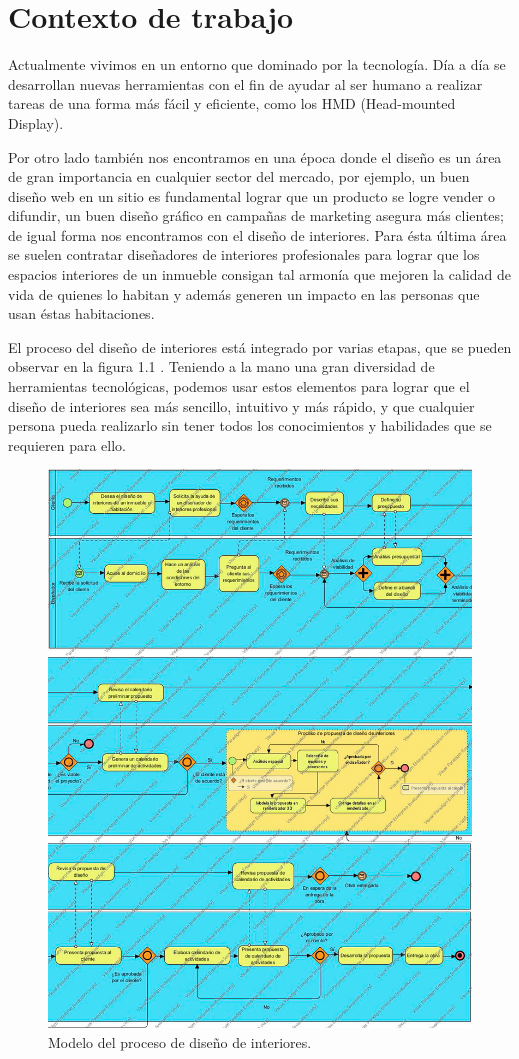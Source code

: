 \section{Contexto de trabajo}

Actualmente vivimos en un entorno que dominado por la tecnología. Día a día se desarrollan nuevas herramientas con el fin de ayudar al ser humano a realizar tareas de una forma más fácil y eficiente, como los HMD (Head-mounted Display)\cite{B15}.


Por otro lado también nos encontramos en una época donde el diseño es un área de gran importancia en cualquier sector del mercado, por ejemplo, un buen diseño web en un sitio es fundamental lograr que un producto se logre vender o difundir, un buen diseño gráfico en campañas de marketing asegura más clientes; de igual forma nos encontramos con el diseño de interiores. Para ésta última área se suelen contratar diseñadores de interiores profesionales para lograr que los espacios interiores de un inmueble consigan tal armonía que mejoren la calidad de vida de quienes lo habitan y además generen un impacto en las personas que usan éstas habitaciones.\par
El proceso del diseño de interiores está integrado por varias etapas, que se pueden observar en la figura 1.1	.
Teniendo a la mano una gran diversidad de herramientas tecnológicas, podemos usar estos elementos para lograr que el diseño de interiores sea más sencillo, intuitivo y más rápido, y que cualquier persona pueda realizarlo sin tener todos los conocimientos y habilidades que se requieren para ello.
\newpage

\begin{figure}[!htbp]
	\centering
	\includegraphics[width=16cm]{imagenes/marcoteorico/bpmn01.png}
	\caption{Modelo del proceso de diseño de interiores.}
	\label{fig:bpmn_antes}
\end{figure}

